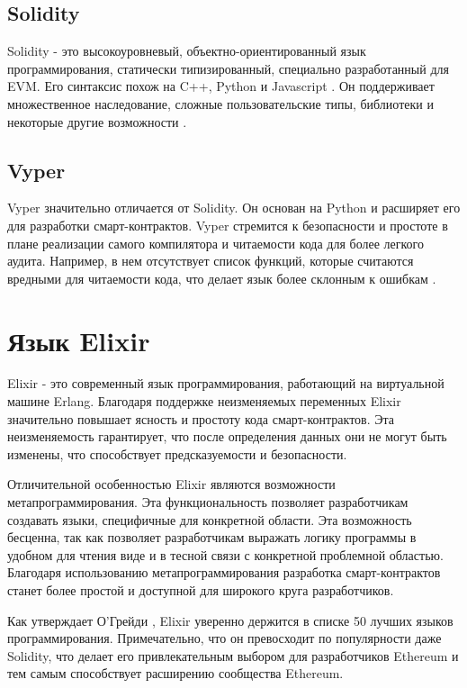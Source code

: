 \subsection{Solidity}

Solidity - это высокоуровневый, объектно-ориентированный язык программирования, статически типизированный, специально разработанный для EVM. Его синтаксис похож на C++, Python и Javascript \cite{SolidityInspirasion}. Он поддерживает множественное наследование, сложные пользовательские типы, библиотеки и некоторые другие возможности \cite{SolidityFeatures}.

\subsection{Vyper}

Vyper значительно отличается от Solidity. Он основан на Python и расширяет его для разработки смарт-контрактов. Vyper стремится к безопасности и простоте в плане реализации самого компилятора и читаемости кода для более легкого аудита. Например, в нем отсутствует список функций, которые считаются вредными для читаемости кода, что делает язык более склонным к ошибкам \cite{VyperDescription}.

\section{Язык Elixir}
\label{sec:ex}

Elixir \cite{ElixirOfficialWebSite} - это современный язык программирования, работающий на виртуальной машине Erlang. Благодаря поддержке неизменяемых переменных Elixir значительно повышает ясность и простоту кода смарт-контрактов. Эта неизменяемость гарантирует, что после определения данных они не могут быть изменены, что способствует предсказуемости и безопасности.

Отличительной особенностью Elixir являются возможности метапрограммирования. Эта функциональность позволяет разработчикам создавать языки, специфичные для конкретной области. Эта возможность бесценна, так как позволяет разработчикам выражать логику программы в удобном для чтения виде и в тесной связи с конкретной проблемной областью. Благодаря использованию метапрограммирования разработка смарт-контрактов станет более простой и доступной для широкого круга разработчиков.

Как утверждает О'Грейди \cite{RedMonk}, Elixir уверенно держится в списке 50 лучших языков программирования. Примечательно, что он превосходит по популярности даже Solidity, что делает его привлекательным выбором для разработчиков Ethereum и тем самым способствует расширению сообщества Ethereum.

